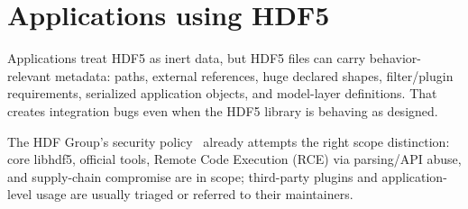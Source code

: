 \documentclass[../main.tex]{subfiles}
\begin{document}
\section{Applications using HDF5}
\label{sec:applications}

Applications treat HDF5 as inert data, but HDF5 files can carry
behavior-relevant metadata: paths, external references, huge
declared shapes, filter/plugin requirements, serialized
application objects, and model-layer definitions. That creates
integration bugs even when the HDF5 library is behaving as
designed.

The HDF Group's security policy~\cite{hdf5-sec-pol} already attempts the right scope
distinction: core libhdf5, official tools, Remote Code Execution (RCE)
via parsing/API abuse, and supply-chain compromise are in scope;
third-party plugins and application-level usage are usually
triaged or referred to their maintainers.

\begingroup
\scriptsize
\setlength{\tabcolsep}{2pt}
\renewcommand{\arraystretch}{1.15}
\setlength{\LTleft}{-0.7in}
\setlength{\LTright}{-0.7in}
\end{document}

